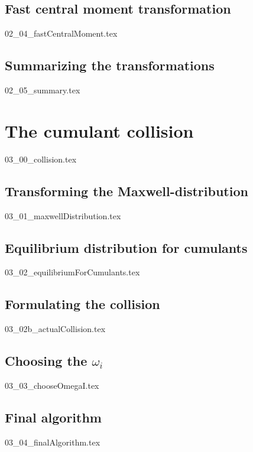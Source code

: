 \documentclass[12pt,a4paper,twoside]{article}
\begin{document}
\subsection{Fast central moment transformation}
\label{sub: Fast central moment transformation}
{02_04_fastCentralMoment.tex}

\subsection{Summarizing the transformations}
\label{sub: Summarizing the transformations}
{02_05_summary.tex}

\newpage
\section{The cumulant collision}
\label{sec: The cumulant collision}
{03_00_collision.tex}

\subsection{Transforming the Maxwell-distribution}
\label{sub: Transforming the Maxwell-distribution}
{03_01_maxwellDistribution.tex}

\subsection{Equilibrium distribution for cumulants}
\label{sub: Equilibrium distribution for cumulants}
{03_02_equilibriumForCumulants.tex}

\subsection{Formulating the collision}
\label{sub: Formulating the collision}
{03_02b_actualCollision.tex}

\subsection{Choosing the \texorpdfstring{$\omega_i$}{omega i}}
\label{sub: Choosing the omega i}
{03_03_chooseOmegaI.tex}

\subsection{Final algorithm}
\label{sub: Final algorithm}
{03_04_finalAlgorithm.tex}
\end{document}
